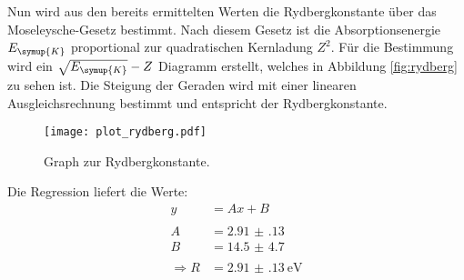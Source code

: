 Nun wird aus den bereits ermittelten Werten die Rydbergkonstante über das Moseleysche-Gesetz
bestimmt. Nach diesem Gesetz ist die Absorptionsenergie $E_\symup{K}$ proportional zur
quadratischen Kernladung $Z^2$. Für die Bestimmung wird ein $\sqrt{E_\symup{K}}-Z$ Diagramm
erstellt, welches in Abbildung \eqref{fig:rydberg} zu sehen ist. Die Steigung der Geraden
wird mit einer linearen Ausgleichsrechnung bestimmt und entspricht der Rydbergkonstante.

\begin{figure}[H]
  \centering
  \texttt{[image: plot\_rydberg.pdf]}
  \caption{Graph zur Rydbergkonstante.}
  \label{fig:rydberg}
\end{figure}

Die Regression liefert die Werte:
\begin{align*}
  y &= Ax+B\\\\
  A &= \num{2.91(13)}\\
  B &= \num{14.5(47)}\\\\
  \Rightarrow R &= \SI{2.91(13)}{\eV}
\end{align*}
